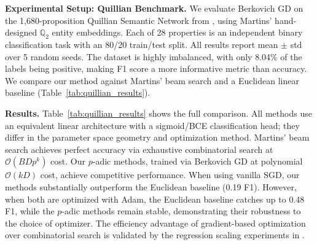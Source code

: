 \textbf{Experimental Setup: Quillian Benchmark.}
We evaluate Berkovich GD on the 1,680-proposition Quillian Semantic Network from \citet{martins2025learning}, using Martins' hand-designed $\mathbb{Q}_2$ entity embeddings. Each of 28 properties is an independent binary classification task with an 80/20 train/test split. All results report mean $\pm$ std over 5 random seeds. The dataset is highly imbalanced, with only 8.04\% of the labels being positive, making F1 score a more informative metric than accuracy. We compare our method against Martins' beam search and a Euclidean linear baseline (Table~\ref{tab:quillian_results}).

\textbf{Results.}
Table~\ref{tab:quillian_results} shows the full comparison. All methods use an equivalent linear architecture with a sigmoid/BCE classification head; they differ in the parameter space geometry and optimization method. Martins' beam search achieves perfect accuracy via exhaustive combinatorial search at $\mathcal{O}(BDp^k)$ cost. Our $p$-adic methods, trained via Berkovich GD at polynomial $\mathcal{O}(kD)$ cost, achieve competitive performance. When using vanilla SGD, our methods substantially outperform the Euclidean baseline (0.19 F1). However, when both are optimized with Adam, the Euclidean baseline catches up to 0.48 F1, while the $p$-adic methods remain stable, demonstrating their robustness to the choice of optimizer. The efficiency advantage of gradient-based optimization over combinatorial search is validated by the regression scaling experiments in .

